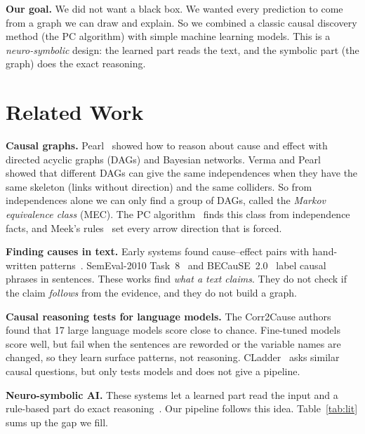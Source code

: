 \documentclass[conference]{IEEEtran}
\begin{document}
\textbf{Our goal.} We did not want a black box. We wanted every prediction to come from a graph we can draw and
explain. So we combined a classic causal discovery method (the PC algorithm) with simple machine learning models.
This is a \emph{neuro-symbolic} design: the learned part reads the text, and the symbolic part (the graph) does
the exact reasoning.

\section{Related Work}
\textbf{Causal graphs.} Pearl~\cite{pearl2009} showed how to reason about cause and effect with directed acyclic
graphs (DAGs) and Bayesian networks. Verma and Pearl~\cite{verma1990} showed that different DAGs can give the
same independences when they have the same skeleton (links without direction) and the same colliders. So from
independences alone we can only find a group of DAGs, called the \emph{Markov equivalence class} (MEC). The PC
algorithm~\cite{spirtes2000} finds this class from independence facts, and Meek's rules~\cite{meek1995} set every
arrow direction that is forced.

\textbf{Finding causes in text.} Early systems found cause--effect pairs with hand-written patterns~\cite{khoo2000}.
SemEval-2010 Task~8~\cite{hendrickx2010} and BECauSE~2.0~\cite{dunietz2017} label causal phrases in sentences.
These works find \emph{what a text claims}. They do not check if the claim \emph{follows} from the evidence, and
they do not build a graph.

\textbf{Causal reasoning tests for language models.} The Corr2Cause authors~\cite{jin2024} found that 17 large
language models score close to chance. Fine-tuned models score well, but fail when the sentences are reworded or
the variable names are changed, so they learn surface patterns, not reasoning. CLadder~\cite{jin2023cladder} asks
similar causal questions, but only tests models and does not give a pipeline.

\textbf{Neuro-symbolic AI.} These systems let a learned part read the input and a rule-based part do exact
reasoning~\cite{garcez2023}. Our pipeline follows this idea. Table~\ref{tab:lit} sums up the gap we fill.
\end{document}
